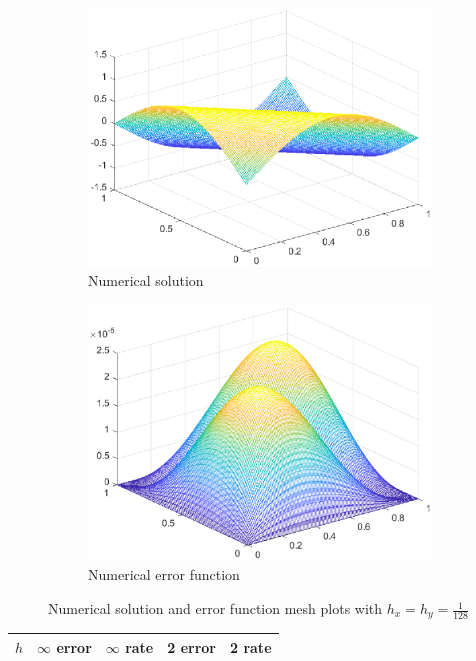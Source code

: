 \documentclass{homework}
\begin{document}
\begin{alphaparts}
		\begin{figure}[h]
			\begin{subfigure}{.45\textwidth}
				\centering
				\includegraphics[width=\textwidth]{p1c_u.eps}
				\caption{Numerical solution}
			\end{subfigure}
			\hfill
			\begin{subfigure}{.45\textwidth}
				\centering
				\includegraphics[width=\textwidth]{p1c_error.eps}
				\caption{Numerical error function}
			\end{subfigure}
			\caption{Numerical solution and error function mesh plots with $h_x = h_y=\frac{1}{128}$}
			\label{fig:p1c}
		\end{figure}
		
		\questionpart 
		
		\begin{table}
			\centering
			\begin{tabular}{@{}lllll@{}}
				\toprule
				$h$ & $\infty$ error & $\infty$ rate & 2 error & 2 rate \\
				\midrule
				
				\bottomrule
			\end{tabular}
		\end{table}
	\end{alphaparts}
	
\end{document}
